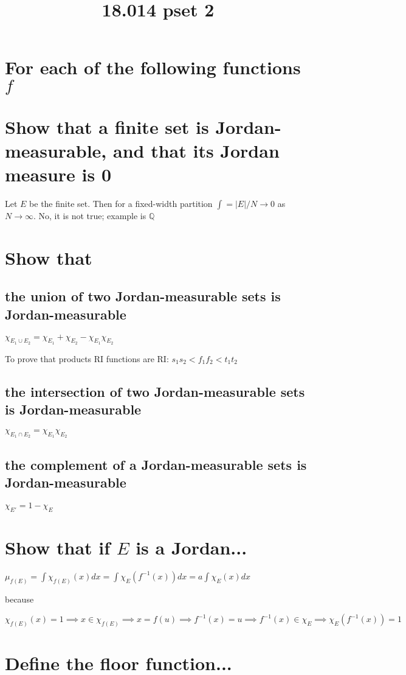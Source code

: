 \documentclass{article}
\title{18.014 pset 2}
\date{}
\begin{document}
\maketitle

\setcounter{section}{17}
\section{For each of the following functions $f$}

\section{Show that a finite set is Jordan-measurable, and that its Jordan measure is 0}

Let $E$ be the finite set. Then for a fixed-width partition $\int = |E|/N \rightarrow 0$ as $N \rightarrow \infty$. No, it is not true; example is $\mathbb{Q}$

\section{Show that}
\subsection*{the union of two Jordan-measurable sets is Jordan-measurable}

$\chi_{E_1 \cup E_2} = \chi_{E_1} + \chi_{E_2} - \chi_{E_1}\chi_{E_2}$

To prove that products RI functions are RI: $s_1s_2 < f_1f_2 < t_1t_2$

\subsection*{the intersection of two Jordan-measurable sets is Jordan-measurable}

$\chi_{E_1 \cap E_2} = \chi_{E_1}\chi_{E_2}$

\subsection*{the complement of a Jordan-measurable sets is Jordan-measurable}

$\chi_{E'} = 1 - \chi_{E}$

\section{Show that if $E$ is a Jordan...}

$\mu_{f(E)} = \int \chi_{f(E)} (x) dx = \int\chi_E(f^{-1}(x)) dx = a\int\chi_E(x)dx$

because

$\chi_{f(E)} (x) = 1 \implies x \in \chi_{f(E)} \implies x = f(u) \implies f^{-1}(x) = u \implies f^{-1}(x) \in \chi_{E} \implies \chi_E(f^{-1}(x)) = 1$

\section{Define the floor function...}
\end{document}

